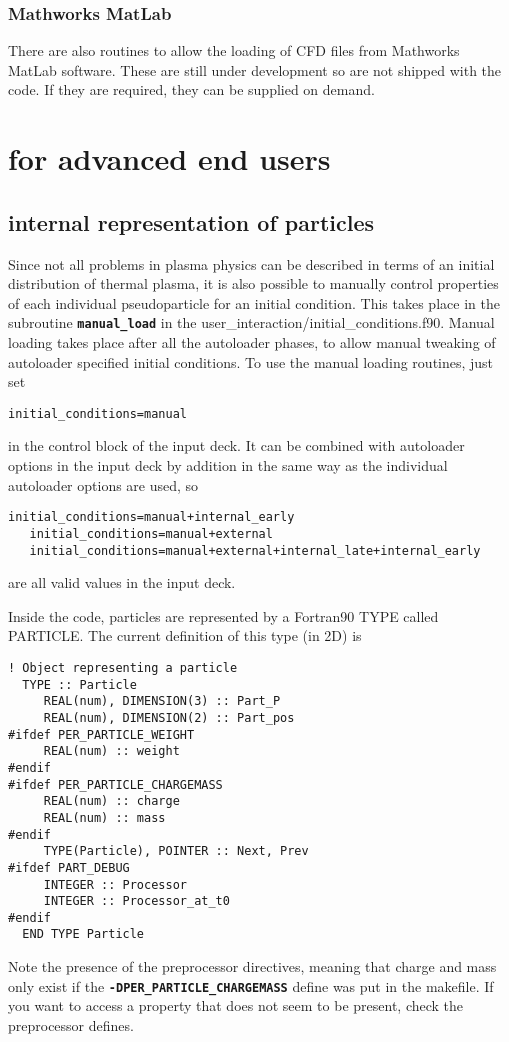 \documentclass[12pt,a4paper]{article}
\newcommand{\simpleboxverbatim}{\begin{Verbatim}[obeytabs=true,frame=single,
  framerule=0.5mm,rulecolor=\color{warwickmid},formatcom=\color{black}]}
\newcommand{\inlinecode}[1]{{\color{warwickred} \bf\texttt{#1}}}
\newcommand{\EPOCH}{{\color{warwickdark}\fontfamily{phv}\selectfont{EPOCH}}}
\begin{document}
\subsubsection{Mathworks MatLab}
There are also routines to allow the loading of CFD files from Mathworks
MatLab software. These are still under development so are not shipped with the
code. If they are required, they can be supplied on demand.

\section{{\EPOCH} for advanced end users}

\subsection{{\EPOCH} internal representation of particles}
Since not all problems in plasma physics can be described in terms of an
initial distribution of thermal plasma, it is also possible to manually
control properties of each individual pseudoparticle for an initial
condition. This takes place in the subroutine \inlinecode{manual\_load} in the
user\_interaction/initial\_conditions.f90. Manual loading takes place after
all the autoloader phases, to allow manual tweaking of autoloader specified
initial conditions. To use the manual loading routines, just set\\
\simpleboxverbatim
   initial_conditions=manual
\end{Verbatim}
in the control block of the input deck. It can be combined with autoloader
options in the input deck by addition in the same way as the individual
autoloader options are used, so
\simpleboxverbatim
   initial_conditions=manual+internal_early
   initial_conditions=manual+external
   initial_conditions=manual+external+internal_late+internal_early
\end{Verbatim}
are all valid values in the input deck.

Inside the code, particles are represented by a Fortran90 TYPE called
PARTICLE. The current definition of this type (in 2D) is

\simpleboxverbatim
! Object representing a particle
  TYPE :: Particle
     REAL(num), DIMENSION(3) :: Part_P
     REAL(num), DIMENSION(2) :: Part_pos
#ifdef PER_PARTICLE_WEIGHT
     REAL(num) :: weight
#endif
#ifdef PER_PARTICLE_CHARGEMASS
     REAL(num) :: charge
     REAL(num) :: mass
#endif
     TYPE(Particle), POINTER :: Next, Prev
#ifdef PART_DEBUG
     INTEGER :: Processor
     INTEGER :: Processor_at_t0
#endif
  END TYPE Particle
\end{Verbatim}
Note the presence of the preprocessor directives, meaning that charge and mass
only exist if the \inlinecode{-DPER\_PARTICLE\_CHARGEMASS} define was put in
the makefile. If you want to access a property that does not seem to be
present, check the preprocessor defines.
\end{document}

